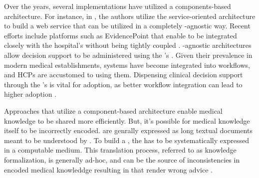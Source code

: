 Over the years, several \CDSS{} implementations have utilized a
components-based architecture. For instance, in \cite{KawamotoJBI10}, the
authors utilize the service-oriented architecture \cite{ErlBook05} to build
a \CDSS{} web service that can be utilized in a completely \EHR{}-agnostic way.
Recent efforts include \CDSSs{} platforms such as
EvidencePoint that enable \CDSS{} to be integrated
closely with the hospital's \EHR{} without being tightly coupled \cite{SolomonJMIR23}.
\EHR{}-agnostic architectures allow decision support to be administered using the
\EHR{}'s \UI{}. Given their prevalence in modern medical establishments,
\EHR{} systems have become integrated into workflows,
and HCPs are accustomed to using them. Dispensing clinical decision
support through the \EHR{}'s \UI{} is vital for adoption, as better workflow
integration can lead to higher adoption \cite{PressJMIR16,LiJMI16}.

Approaches that utilize a component-based architecture
enable medical knowledge to be shared more efficiently.
But, it's possible for medical knowledge itself to be incorrectly
encoded. \BPGs{} are genrally expressed as long textual documents meant to
be understood by \HCPs{} \cite{SchiffmanYMI13}. To build a \CDSS{}, the \BPG{} has to be
systematically expressed in a computable medium. This translation process,
referred to as knowledge formalization, is generally ad-hoc, and can be
the source of inconsistencies in encoded medical knowleddge
resulting in \CDSSs{} that render wrong advice .




